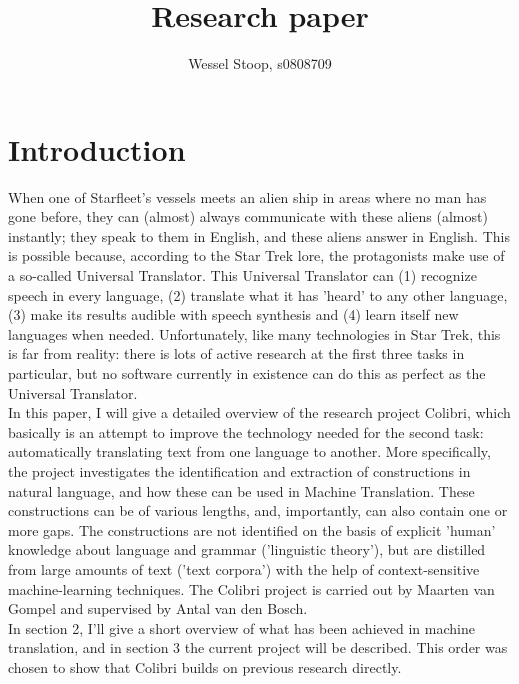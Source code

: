 \documentclass[12pt]{article}
\title{Research paper}
\author{Wessel Stoop, s0808709}
\begin{document}
\maketitle

\section{Introduction}

When one of Starfleet's vessels meets an alien ship in areas where no man has gone before, they can (almost) always communicate with these aliens (almost) instantly; they speak to them in English, and these aliens answer in English. This is possible because, according to the Star Trek lore, the protagonists make use of a so-called Universal Translator. This Universal Translator can (1) recognize speech in every language, (2) translate what it has 'heard' to any other language, (3) make its results audible with speech synthesis and (4) learn itself new languages when needed. Unfortunately, like many technologies in Star Trek, this is far from reality: there is lots of active research at the first three tasks in particular, but no software currently in existence can do this as perfect as the Universal Translator. \\\indent
In this paper, I will give a detailed overview of the research project Colibri, which basically is an attempt to improve the technology needed for the second task: automatically translating text from one language to another. More specifically, the project investigates the identification and extraction of constructions in natural language, and how these can be used in Machine Translation. These constructions can be of various lengths, and, importantly, can also contain one or more gaps. The constructions are not identified on the basis of explicit 'human' knowledge about language and grammar ('linguistic theory'), but are distilled from large amounts of text ('text corpora') with the help of context-sensitive machine-learning techniques. The Colibri project is carried out by Maarten van Gompel and supervised by Antal van den Bosch.
\\\indent
In section 2, I'll give a short overview of what has been achieved in machine translation, and in section 3 the current project will be described. This order was chosen to show that Colibri builds on previous research directly.

\end{document}
